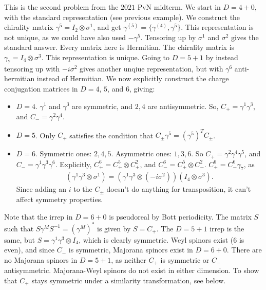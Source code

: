 \documentclass[11pt]{article}
\begin{document}
\begin{eexample}
    This is the second problem from the $2021$ PvN midterm.
    We start in $D = 4 + 0$, with the standard representation
    (see previous example). We construct the chirality matrix
    $\gamma^5 = I_2 \otimes \sigma^1$, and get $\gamma^{(5)} = \{ \gamma^{(4)}, \gamma^5 \}$.
    This representation is not unique, as we could have
    also used $- \gamma^5$. Tensoring up by $\sigma^1$
    and $\sigma^2$ gives the standard answer. Every matrix
    here is Hermitian. The chirality matrix is $\gamma_7 = I_4 \otimes \sigma^3$.
    This representation is unique. Going to $D = 5 + 1$ by
    instead tensoring up with $-i \sigma^2$ gives another
    unqiue representation, but with $\gamma^6$ anti-hermitian
    instead of Hermitian. We now explicitly construct the charge conjugation
    matrices in $D = 4$, $5$, and $6$, giving:
    \begin{itemize}
        \item $D = 4$. $\gamma^1$ and $\gamma^3$ are symmetric,
        and $2, 4$ are antisymmetric. So, $C_+ = \gamma^1 \gamma^3$,
        and $C_- = \gamma^2 \gamma^4$.
        \item $D = 5$. Only $C_+$ satisfies the condition that
        $C_\pm \gamma^5 = (\gamma^5)^T C_\pm$.
        \item $D = 6$. Symmetric ones: $2, 4, 5$. Asymmetric ones: $1, 3, 6$.
        So $C_+ = \gamma^2 \gamma^4 \gamma^5$, and $C_- = \gamma^1 \gamma^3 \gamma^6$.
        Explicitly, $C_+^6 = C_+^5 \otimes C_+^2$, and $C_-^6 = C_+^5 \otimes C_-^2$.
        $C_+^6 = C_-^6 \gamma_7$, as
        \begin{align*}
            (\gamma^1 \gamma^3 \otimes \sigma^1) = (\gamma^1 \gamma^3 \otimes (- i \sigma^2)) (I_4 \otimes \sigma^3).
        \end{align*}
        Since adding an $i$ to the $C_\pm$ doesn't do anything for transposition,
        it can't affect symmetry properties.
    \end{itemize}
    Note that the irrep in $D = 6 + 0$ is pseudoreal by Bott periodicity.
    The matrix $S$ such that $S \gamma^M S^{-1} = (\gamma^M)^*$ is given by
    $S = C_+$. The $D = 5 + 1$ irrep is the same, but $S = \gamma^1 \gamma^3 \otimes I_4$,
    which is clearly symmetric. Weyl spinors exist ($6$ is even), and 
    since $C_-$ is symmetric, Majorana spinors exist in $D = 6 + 0$.
    There are no Majorana spinors in $D = 5 + 1$, as neither $C_+$
    is symmetric or $C_-$ antisymmetric. Majorana-Weyl spinors do
    not exist in either dimension. To show that $C_+$ stays symmetric
    under a similarity transformation, see below.
\end{eexample}
\end{document}
